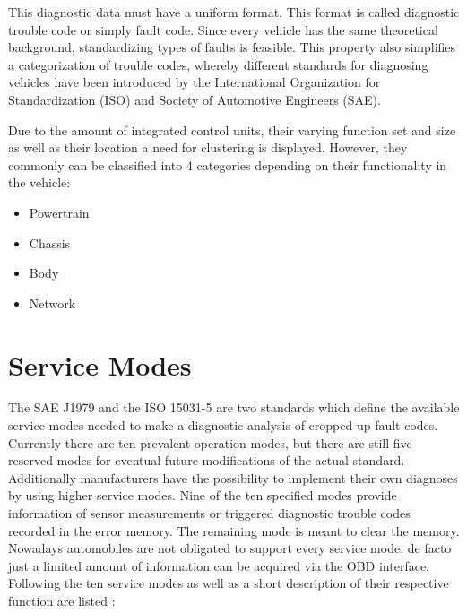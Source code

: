 This diagnostic data must have a uniform format. This format is called diagnostic trouble code or simply fault code. Since every 
vehicle has the same theoretical background, standardizing types of faults is feasible. This property also simplifies a categorization 
of trouble codes, whereby different standards for diagnosing vehicles have been introduced by the International Organization for 
Standardization (ISO) and Society of Automotive Engineers (SAE). 

Due to the amount of integrated control units, their varying function set and size as well as their location a need for clustering is 
displayed. However, they commonly can be classified into 4 categories depending on their functionality in the vehicle:
\begin{itemize}
 \item Powertrain 
 \item Chassis 
 \item Body 
 \item Network
\end{itemize}

\section{Service Modes}

The SAE J1979 and the ISO 15031-5 are two standards which define the available service modes needed to make a diagnostic analysis of cropped up fault codes. Currently there are ten prevalent operation modes, but there are still five reserved modes for eventual future modifications of the actual standard. Additionally manufacturers have the possibility to implement their own diagnoses by using higher service modes.
Nine of the ten specified modes provide information of sensor measurements or triggered diagnostic trouble codes recorded in the error memory. The remaining mode is meant to clear the memory. Nowadays automobiles are not obligated to support every service  mode, de facto just a limited amount of information can be acquired via the OBD interface.
Following the ten service modes as well as a short description of their respective function are listed \cite{SCHAFOBD2}:

